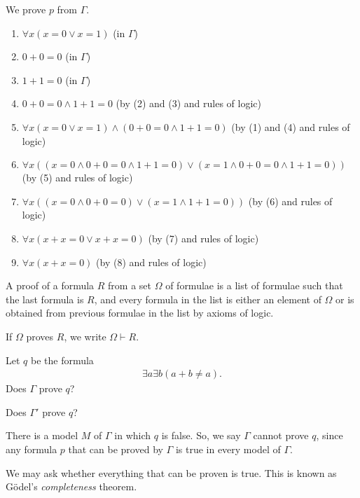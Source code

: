\documentclass[10pt]{mypackage}
\begin{document}
\begin{example}
  We prove $p$ from $\Gamma$.
  \begin{enumerate}[(1)]
    \item $\forall x \left(x=0 \vee x = 1\right)$ (in $\Gamma$)
    \item $0 + 0 = 0$ (in $\Gamma$)
    \item $1 + 1 = 0$ (in $\Gamma$)
    \item $0 + 0 = 0 \wedge 1 + 1 = 0$ (by (2) and (3) and rules of logic)
    \item $\forall x \left(x = 0 \vee x = 1\right) \wedge \left(0 + 0 = 0\wedge 1 + 1 = 0\right)$ (by (1) and (4) and rules of logic)
    \item $\forall x \left( \left(x = 0 \wedge 0 + 0 = 0 \wedge 1 + 1 = 0\right) \vee \left(x = 1 \wedge 0 + 0 = 0 \wedge 1 + 1 = 0\right)\right)$ (by (5) and rules of logic)
    \item $\forall x\left(\left(x = 0 \wedge 0 + 0 = 0 \right)\vee \left(x=1 \wedge 1 + 1 = 0\right)\right)$ (by (6) and rules of logic)
    \item $\forall x \left(x + x = 0 \vee x + x = 0\right)$ (by (7) and rules of logic)
    \item $\forall x \left(x + x = 0\right)$ (by (8) and rules of logic)
  \end{enumerate}
\end{example}

\begin{definition}
  A proof of a formula $R$ from a set $\Omega$ of formulae is a list of formulae such that the last formula is $R$, and every formula in the list is either an element of $\Omega$ or is obtained from previous formulae in the list by axioms of logic.\newline

  If $\Omega$ proves $R$, we write $\Omega \vdash R$.
\end{definition}
\begin{question}[]
Let $q$ be the formula
\begin{align*}
  \exists a \exists b \left(a + b \neq a\right).
\end{align*}
Does $\Gamma$ prove $q$?\newline

Does $\Gamma'$ prove $q$?
\end{question}
\begin{answer}[]
  There is a model $M$ of $\Gamma$ in which $q$ is false. So, we say $\Gamma$ cannot prove $q$, since any formula $p$ that can be proved by $\Gamma$ is true in every model of $\Gamma$.
\end{answer}
We may ask whether everything that can be proven is true. This is known as Gödel's \textit{completeness} theorem.\newline
\end{document}
